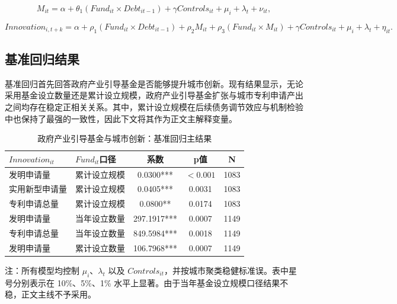 \begin{equation}
M_{it}=\alpha+\theta_1(Fund_{it}\times Debt_{it-1})+\gamma Controls_{it}+\mu_i+\lambda_t+\nu_{it},
\end{equation}

\begin{equation}
Innovation_{i,t+k}=\alpha+\rho_1(Fund_{it}\times Debt_{it-1})+\rho_2 M_{it}+\rho_3(Fund_{it}\times M_{it})+\gamma Controls_{it}+\mu_i+\lambda_t+\eta_{it}.
\end{equation}

\subsection{基准回归结果}

基准回归首先回答政府产业引导基金是否能够提升城市创新。现有结果显示，无论采用基金设立数量还是累计设立规模，政府产业引导基金扩张与城市专利申请产出之间均存在稳定正相关关系。其中，累计设立规模在后续债务调节效应与机制检验中也保持了最强的一致性，因此下文将其作为正文主解释变量。

\begin{table}[htbp]
  \centering
  \caption{政府产业引导基金与城市创新：基准回归主结果}
  {\fangsong{}
  \begin{tabularx}{0.96\linewidth}{l l c c c}
    \toprule
    $Innovation_{it}$ & $Fund_{it}$口径 & 系数 & p值 & N \\
    \midrule
    发明申请量 & 累计设立规模 & 0.0300*** & $<0.001$ & 1083 \\
    实用新型申请量 & 累计设立规模 & 0.0405*** & 0.0031 & 1083 \\
    专利申请总量 & 累计设立规模 & 0.0800** & 0.0174 & 1083 \\
    发明申请量 & 当年设立数量 & 297.1917*** & 0.0007 & 1149 \\
    专利申请总量 & 当年设立数量 & 849.5984*** & 0.0018 & 1149 \\
    发明申请量 & 累计设立数量 & 106.7968*** & 0.0007 & 1149 \\
    \bottomrule
  \end{tabularx}

  \par\smallskip
  {\songti{}注：所有模型均控制 $\mu_i$、$\lambda_t$ 以及 $Controls_{it}$，并按城市聚类稳健标准误。表中星号分别表示在 10\%、5\%、1\% 水平上显著。由于当年基金设立规模口径结果不稳，正文主线不予采用。}
  }
\end{table}

